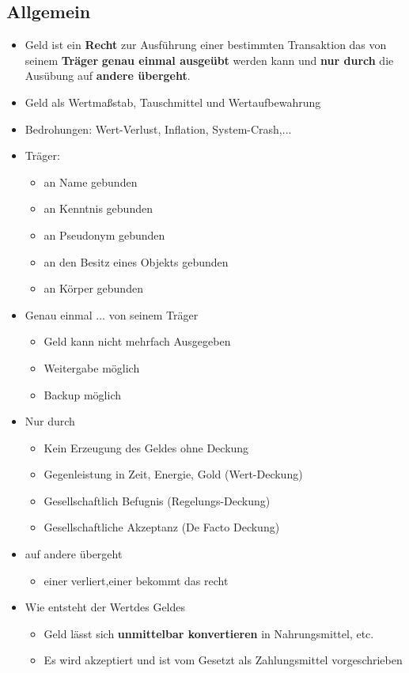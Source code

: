 \documentclass{article} %
\begin{document}
	\subsection{Allgemein}
	\begin{itemize}
		\item \glqq Geld ist ein \textbf{Recht} zur Ausführung einer bestimmten Transaktion das von seinem \textbf{Träger} \textbf{genau einmal ausgeübt} werden kann und \textbf{nur durch} die Ausübung auf \textbf{andere übergeht}.\grqq
		\item Geld als Wertmaßstab, Tauschmittel und Wertaufbewahrung
		\item Bedrohungen: Wert-Verlust, Inflation, System-Crash,...
		\item \glqq Träger:\grqq
		\begin{itemize}
			\item an Name gebunden
			\item an Kenntnis gebunden
			\item an Pseudonym gebunden
			\item an den Besitz eines Objekts gebunden
			\item an Körper gebunden
		\end{itemize}
		\item \glqq Genau einmal ... von seinem Träger \grqq
		\begin{itemize}
			\item Geld kann nicht mehrfach Ausgegeben
			\item Weitergabe möglich
			\item Backup möglich
		\end{itemize}
		\item \glqq Nur durch\grqq
		\begin{itemize}
			\item Kein Erzeugung des Geldes ohne Deckung
			\item Gegenleistung in Zeit, Energie, Gold (Wert-Deckung)
			\item Gesellschaftlich Befugnis (Regelungs-Deckung)
			\item Gesellschaftliche Akzeptanz (De Facto Deckung)
		\end{itemize}
		\item \glqq auf andere übergeht\grqq
		\begin{itemize}
			\item einer verliert,einer bekommt das recht
		\end{itemize}
		\item Wie entsteht der \glqq Wert\grqq des Geldes
		\begin{itemize}
			\item Geld lässt sich \textbf{unmittelbar konvertieren} in Nahrungsmittel, etc.
			\item Es wird akzeptiert und ist vom Gesetzt als Zahlungsmittel vorgeschrieben 
		\end{itemize}
	\end{itemize}
\end{document}
